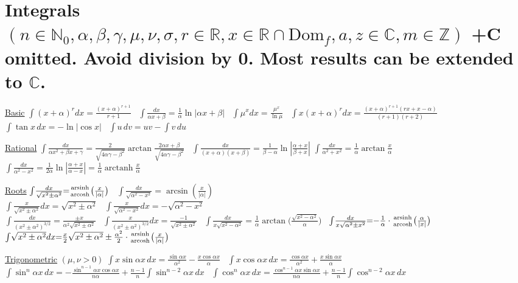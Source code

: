 \section*{Integrals%
\normalfont\scriptsize{$(n\in\mathbb{N}_0,\alpha,\beta,\gamma,\mu,\nu,\sigma,r\in\mathbb{R},x\in\mathbb{R}\cap\mathrm{Dom}_f,a,z\in\mathbb{C},m\in\mathbb{Z})$ +C omitted.}%
\normalfont\scriptsize{Avoid division by 0. Most results can be extended to $\mathbb{C}$.}%
}

\footnotesize{
\underline{Basic} $\int\!(x+\alpha)^rdx{=}\frac{(x+\alpha)^{r+1}}{r+1}$ \ $\int\!\frac{dx}{\alpha x+\beta}{=}\frac{1}{\alpha}\ln|\alpha x+\beta|$ \ $\int\!\mu^xdx{=}\frac{\mu^x}{\ln\mu}$ \ $\int\!x(x+\alpha)^rdx{=}\frac{(x+\alpha)^{r+1}(rx{+}x{-}\alpha)}{(r{+}1)(r{+}2)}$ \ $\int\!\tan x\,dx{=}{-}\ln|\cos x|$ \ $\int\!u\,dv{=}uv{-}\int v\,du$

\underline{Rational} 
$\int\!\frac{dx}{\alpha x^2+\beta x+\gamma}{=}\frac{2}{\sqrt{4\alpha\gamma{-}\beta^2}}\arctan\frac{2\alpha x{+}\beta}{\sqrt{4\alpha\gamma{-}\beta^2}}$ \ $\int\!\frac{dx}{(x{+}\alpha)(x{+}\beta)}{=}\frac{1}{\beta{-}\alpha}\ln|\frac{\alpha{+}x}{\beta{+}x}|$ $\int\!\frac{dx}{\alpha^2+x^2}{=}\frac{1}{\alpha}\arctan\frac{x}{\alpha}$ \ $\int\!\frac{dx}{\alpha^2-x^2}{=}\frac{1}{2\alpha}\ln|\frac{\alpha{+}x}{\alpha{-}x}|{=}\frac{1}{\alpha}\operatorname{arctanh}\frac{x}{\alpha}$  

\underline{Roots}
$\int\!\frac{dx}{\sqrt{x^2\pm\alpha^2}}{=}\genfrac{}{}{0pt}{}{\operatorname{arsinh}}{\operatorname{arcosh}}\big(\frac{x}{|\alpha|}\big)$ \ $\int\!\frac{dx}{\sqrt{\alpha^2{-}x^2}}{=}\arcsin(\frac{x}{|\alpha|})$ \\ $\int\!\frac{x}{\sqrt{x^2\pm\alpha^2}}dx{=}\sqrt{x^2\pm\alpha^2}$ \ $\int\!\frac{x}{\sqrt{\alpha^2{-}x^2}}dx{=}{-}\sqrt{\alpha^2{-}x^2}$\\ 
$\int\!\frac{dx}{(x^2\pm\alpha^2)^{3/2}}{=}\frac{\pm x}{\alpha^2\sqrt{x^2\pm\alpha^2}}$ \ $\int\!\frac{x}{(x^2\pm\alpha^2)^{3/2}}dx{=}\frac{{-}1}{\sqrt{x^2\pm\alpha^2}}$ \
$\int\!\frac{dx}{x\sqrt{x^2{-}\alpha^2}}{=}\frac{1}{\alpha}\operatorname{arctan}\big(\frac{\sqrt{x^2{-}\alpha^2}}{\alpha}\big)$ \ $\int\!\frac{dx}{x\sqrt{\alpha^2\pm x^2}}{=}{-}\frac{1}{\alpha}\cdot\genfrac{}{}{0pt}{}{\operatorname{arsinh}}{\operatorname{arcosh}}\big(\frac{\alpha}{|x|}\big)$
$\int\!\sqrt{x^2\pm\alpha^2}dx{=}\frac{x}{2}\sqrt{x^2\pm\alpha^2}\pm\frac{\alpha^2}{2}\cdot\genfrac{}{}{0pt}{}{\operatorname{arsinh}}{\operatorname{arcosh}}\big(\frac{x}{|\alpha|}\big)$ \


\underline{Trigonometric} \scriptsize{$(\mu,\nu>0)$}
$\int\!x\sin\alpha x\,dx{=}\frac{\sin\alpha x}{\alpha^2}{-}\frac{x\cos\alpha x}{\alpha}$ \
$\int\!x\cos\alpha x\,dx{=}\frac{\cos\alpha x}{\alpha^2}{+}\frac{x\sin\alpha x}{\alpha}$ \
$\int\!\sin^n\alpha x\,dx{=}{-}\frac{\sin^{n-1}\alpha x\cos\alpha x}{n\alpha}{+}\frac{n-1}{n}\int\!\sin^{n-2}\alpha x\,dx$ \
$\int\!\cos^n\alpha x\,dx{=}\frac{\cos^{n-1}\alpha x\sin\alpha x}{n\alpha}{+}\frac{n-1}{n}\int\!\cos^{n-2}\alpha x\,dx$

}
